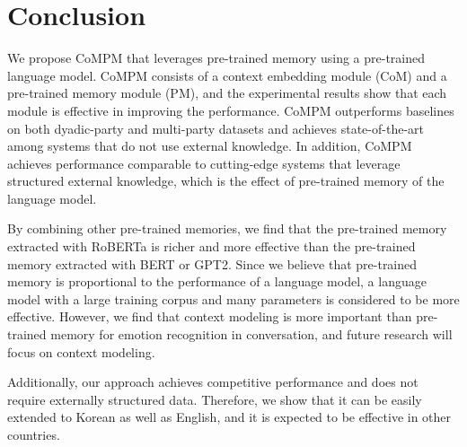 \documentclass[11pt]{article}
\begin{document}
\section{Conclusion}
We propose CoMPM that leverages pre-trained memory using a pre-trained language model. CoMPM consists of a context embedding module (CoM) and a pre-trained memory module (PM), and the experimental results show that each module is effective in improving the performance. CoMPM outperforms baselines on both dyadic-party and multi-party datasets and achieves state-of-the-art among systems that do not use external knowledge. In addition, CoMPM achieves performance comparable to cutting-edge systems that leverage structured external knowledge, which is the effect of pre-trained memory of the language model.


By combining other pre-trained memories, we find that the pre-trained memory extracted with RoBERTa is richer and more effective than the pre-trained memory extracted with BERT or GPT2. Since we believe that pre-trained memory is proportional to the performance of a language model, a language model with a large training corpus and many parameters is considered to be more effective. However, we find that context modeling is more important than pre-trained memory for emotion recognition in conversation, and future research will focus on context modeling.


Additionally, our approach achieves competitive performance and does not require externally structured data. Therefore, we show that it can be easily extended to Korean as well as English, and it is expected to be effective in other countries.





\appendix
\end{document}
